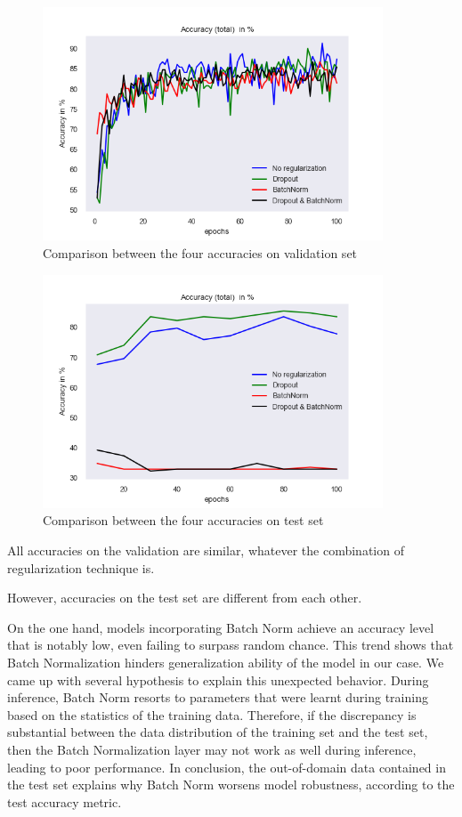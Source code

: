 \documentclass[a4paper]{article}
\begin{document}
\begin{figure}[H]
    \centering
    \includegraphics[width=0.9\textwidth]{img/baptiste/baptiste_val_accuracies_comparison.png}
    \caption{Comparison between the four accuracies on validation set}
\end{figure}


\begin{figure}[H]
    \centering
    \includegraphics[width=0.9\textwidth]{img/baptiste/baptiste_test_accuracies_comparison.png}
    \caption{Comparison between the four accuracies on test set}
\end{figure}


All accuracies on the validation are similar, whatever the combination of regularization technique is.

However, accuracies on the test set are different from each other.

On the one hand, models incorporating Batch Norm achieve an accuracy level that is notably low, even failing to surpass random chance. This trend shows that Batch Normalization hinders generalization ability of the model in our case. We came up with several hypothesis to explain this unexpected behavior. During inference, Batch Norm resorts to parameters that were learnt during training based on the statistics of the training data. Therefore, if the discrepancy is substantial between the data distribution of the training set and the test set, then the Batch Normalization layer may not work as well during inference, leading to poor performance. In conclusion, the out-of-domain data contained in the test set explains why Batch Norm worsens model robustness, according to the test accuracy metric.
\end{document}
